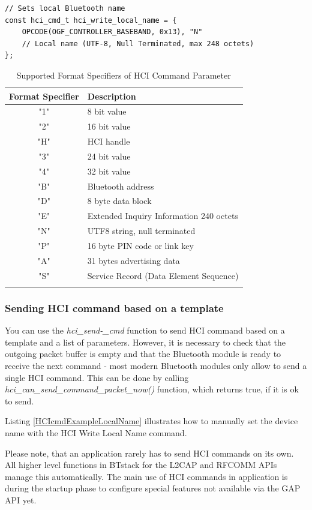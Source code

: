 \begin{lstlisting}[caption= Example of HCI command template., label=HCIcmdExample]
// Sets local Bluetooth name
const hci_cmd_t hci_write_local_name = {
    OPCODE(OGF_CONTROLLER_BASEBAND, 0x13), "N"
    // Local name (UTF-8, Null Terminated, max 248 octets)
};
\end{lstlisting}

\begin{table}\centering
\caption{Supported Format Specifiers of HCI Command Parameter}
\begin{tabular}{cl}\toprule
Format Specifier & Description\\ 
\midrule
"1" & 8 bit value \\
"2" & 16 bit value \\
"H" & HCI handle \\
"3" & 24 bit value \\
"4" & 32 bit value \\
"B" & Bluetooth address \\
"D" & 8 byte data block \\
"E" & Extended Inquiry Information 240 octets \\
"N" & UTF8 string, null terminated \\
"P" & 16 byte PIN code or link key \\
"A" & 31 bytes advertising data \\
"S" & Service Record (Data Element Sequence)\\
\bottomrule
\label{table:hciformat}
\end{tabular}
\end{table}

\subsubsection{Sending  HCI command based on a template}
You can use the \emph{hci\_send-\_cmd} function to send HCI command based on a template and a list of parameters. However, it is necessary to check that the outgoing packet buffer is empty and that the Bluetooth module is ready to receive the next command - most modern Bluetooth modules only allow  to send a single HCI command. 
This can be done by calling \emph{hci\_can\_send\_command\_packet\_now()} function, which returns true, if it is ok to send.

Listing \ref{HCIcmdExampleLocalName} illustrates how to manually set the device name with the HCI Write Local Name command.

Please note, that an application rarely has to send HCI commands on its own. All higher level functions in BTstack for the L2CAP and RFCOMM APIs manage this automatically. The main use of HCI commands in application is during the startup phase to configure special features not available via the GAP API yet.




